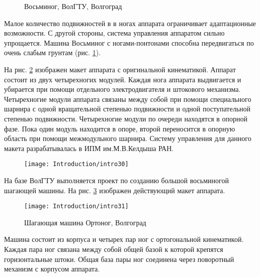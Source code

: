 \begin{figure}[ht]
	\begin{minipage}[ht]{0.49\linewidth}
	\end{minipage}
	\hfill
	\begin{minipage}[ht]{0.49\linewidth}
	\end{minipage}
	\caption{Восьминог, ВолГТУ, Волгоград}
	\label{img:octonog}
\end{figure}

Малое количество подвижностей в в ногах аппарата ограничивает адаптационные возможности. С другой стороны, система управления аппаратом сильно упрощается. Машина Восьминог с ногами-понтонами способна передвигаться по очень слабым грунтам (рис. \ref{img:octonog}).

На рис. \ref{img:ortho} изображен макет аппарата с оригинальной кинематикой. Аппарат состоит из двух четырехногих модулей. Каждая нога аппарата выдвигается и убирается при помощи отдельного электродвигателя и штокового механизма. Четырехногие модули аппарата связаны между собой при помощи специального шарнира с одной вращательной степенью подвижности и одной поступательной степенью подвижности. Четырехногие модули по очереди находятся в опорной фазе. Пока один модуль находится в опоре, второй переносится в опорную область при помощи межмодульного шарнира. Систему управления для данного макета разрабатывалась в ИПМ им.М.В.Келдыша РАН.

\begin{figure}[ht]
	\centering
	\texttt{[image: Introduction/intro30]}
	\caption{}
	\label{img:ortho}
\end{figure}

На базе ВолГТУ выполняется проект по созданию большой восьминогой шагающей машины. На рис. \ref{img:ortho2} изображен действующий макет аппарата.

\begin{figure}[ht]
	\centering
	\texttt{[image: Introduction/intro31]}
	\caption{Шагающая машина Ортоног, Волгоград}
	\label{img:ortho2}
\end{figure}

Машина состоит из корпуса и четырех пар ног с ортогональной кинематикой. Каждая пара ног связана между собой общей базой к которой крепятся горизонтальные штоки. Общая база пары ног соединена через поворотный механизм с корпусом аппарата.